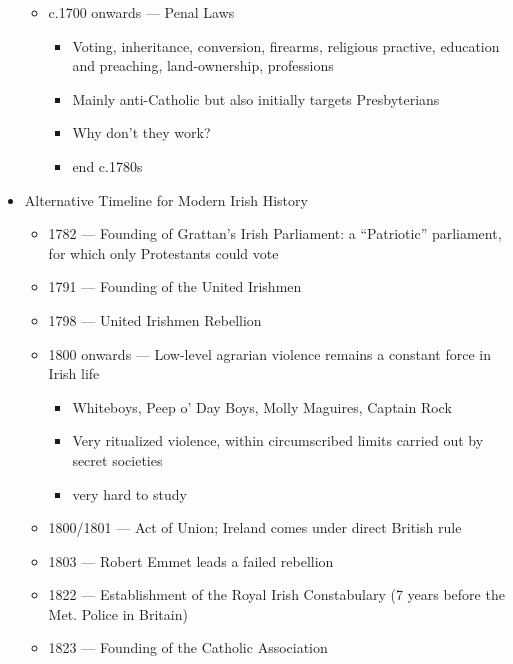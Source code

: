 \documentclass[12pt]{article}
\begin{document}
\begin{itemize}
\begin{itemize}
\begin{itemize}
                    \end{itemize}
                    \item c.1700 onwards --- Penal Laws
                    \begin{itemize}
                        \item Voting, inheritance, conversion, firearms, religious practive, education and preaching, land-ownership, professions
                        \item Mainly anti-Catholic but also initially targets Presbyterians
                        \item Why don't they work?
                        \item end c.1780s
                    \end{itemize}
                \end{itemize} 
                \newpage
                \item Alternative Timeline for Modern Irish History
                \begin{itemize}
                    \item 1782 --- Founding of Grattan's Irish Parliament: a ``Patriotic'' parliament, for which only Protestants could vote
                    \item 1791 --- Founding of the United Irishmen
                    \item 1798 --- United Irishmen Rebellion
                    \item 1800 onwards --- Low-level agrarian violence remains a constant force in Irish life
                    \begin{itemize}
                        \item Whiteboys, Peep o' Day Boys, Molly Maguires, Captain Rock
                        \item Very ritualized violence, within circumscribed limits carried out by secret societies
                        \item very hard to study
                    \end{itemize}
                    \item 1800/1801 --- Act of Union; Ireland comes under direct British rule
                    \item 1803 --- Robert Emmet leads a failed rebellion
                    \item 1822 --- Establishment of the Royal Irish Constabulary (7 years before the Met. Police in Britain)
                    \item 1823 --- Founding of the Catholic Association

\end{itemize}
\end{itemize}
\end{document}
